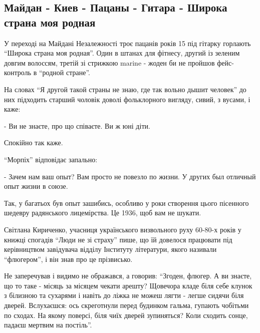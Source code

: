  
 
 
 
 

\subsection{Майдан - Киев - Пацаны - Гитара - Широка страна моя родная}
\label{sec:14_05_2021.fb.promovugroup.1.pacany_pesnja_maidan_kiev_centr_shiroka_strana_moja}

У переході на Майдані Незалежності троє пацанів років 15 під гітарку  горлають
\enquote{Широка страна моя родная}. Один в штанах для фітнесу, другий із зеленим довгим
волоссям, третій зі стрижкою marine - жоден би не пройшов фейс-контроль в
\enquote{родной стране}.

На словах \enquote{Я другой такой страны не знаю, где так вольно дышит человек} до них
підходить старший чоловік доволі фольклорного вигляду, сивий, з вусами, і каже:

- Ви не знаєте, про що співаєте.  Ви ж юні діти.

Спокійно так каже. 

\enquote{Морпіх} відповідає запально:

- Зачем нам ваш опыт? Вам просто не повезло по жизни. У других был отличный опыт жизни в союзе.  

Так, у багатьох був опыт зашибись, особливо у роки створення цього пісенного
шедевру радянського лицемірства. Це 1936, щоб вам не шукати.

Світлана Кириченко, учасниця українського визвольного руху 60-80-х років у
книжці спогадів \enquote{Люди не зі страху} пише, що їй  довелося працювати під
керівництвом завідувача відділу Інституту літератури,  якого називали
\enquote{флюгером}, і він знав про це прізвисько. 

Не заперечував і видимо не ображався, а говорив: \enquote{Згоден, флюгер. А ви знаєте,
що то таке - місяць за місяцем чекати арешту? Щовечора кладе біля себе клунок з
білизною та сухарями і навіть до ліжка не можеш лягти - легше сидячи біля
дверей. Вслухаєшся: ось скреготнули перед будинком гальма, гупають  чобітьми по
сходах. На якому поверсі, біля чиїх дверей зупиняться? Коли сходить сонце,
падаєш мертвим на постіль}.

